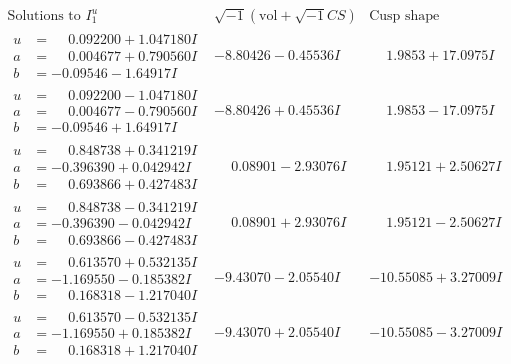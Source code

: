 \documentclass[1p]{elsarticle_modified}
\theoremstyle{definition}
\newcommand{\I}{\sqrt{-1}}
\begin{document}
$$\begin{array}{c|c|c}  
\text{Solutions to }I^u_{1}& \I (\text{vol} + \sqrt{-1}CS) & \text{Cusp shape}\\
 \hline 
\begin{aligned}
u &= \phantom{-}0.092200 + 1.047180 I \\
a &= \phantom{-}0.004677 + 0.790560 I \\
b &= -0.09546 - 1.64917 I\end{aligned}
 & -8.80426 - 0.45536 I & \phantom{-}1.9853 + 17.0975 I \\ \hline\begin{aligned}
u &= \phantom{-}0.092200 - 1.047180 I \\
a &= \phantom{-}0.004677 - 0.790560 I \\
b &= -0.09546 + 1.64917 I\end{aligned}
 & -8.80426 + 0.45536 I & \phantom{-}1.9853 - 17.0975 I \\ \hline\begin{aligned}
u &= \phantom{-}0.848738 + 0.341219 I \\
a &= -0.396390 + 0.042942 I \\
b &= \phantom{-}0.693866 + 0.427483 I\end{aligned}
 & \phantom{-}0.08901 - 2.93076 I & \phantom{-}1.95121 + 2.50627 I \\ \hline\begin{aligned}
u &= \phantom{-}0.848738 - 0.341219 I \\
a &= -0.396390 - 0.042942 I \\
b &= \phantom{-}0.693866 - 0.427483 I\end{aligned}
 & \phantom{-}0.08901 + 2.93076 I & \phantom{-}1.95121 - 2.50627 I \\ \hline\begin{aligned}
u &= \phantom{-}0.613570 + 0.532135 I \\
a &= -1.169550 - 0.185382 I \\
b &= \phantom{-}0.168318 - 1.217040 I\end{aligned}
 & -9.43070 - 2.05540 I & -10.55085 + 3.27009 I \\ \hline\begin{aligned}
u &= \phantom{-}0.613570 - 0.532135 I \\
a &= -1.169550 + 0.185382 I \\
b &= \phantom{-}0.168318 + 1.217040 I\end{aligned}
 & -9.43070 + 2.05540 I & -10.55085 - 3.27009 I \\ \hline\begin{aligned}

\end{aligned}
\end{array}$$
\end{document}
